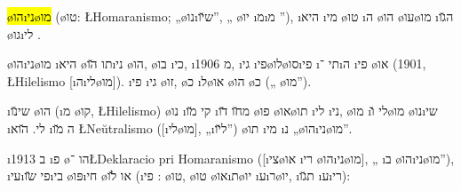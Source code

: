
\hl{\o{הו}\i{ני}\o{מו}} (\o{טו}: \L{Homaranismo}; „\o{נו}\i{ש}\u{יו}”, „  \o{יו}  \i{מ}\i{מ} ”), \i{היא} \i{מי} \o{טו}  \i{ה} \o{הו}     \o{עו}\o{מו}  \i{ה}\u{גו}  \o{גו}\i{לי}   .

\o{הו}\i{ני}\o{מו} \i{היא} \o{תו} \u{הו}\i{ני}  \o{הו},   \o{בו} \i{כי},  \i{מ} 1906,  \i{גי} \i{פי}\o{לו}\o{סו}\i{פי} \i{תי}  ־\i{ה} \i{פי}  \o{או} (1901, \L{Hilelismo} [\i{ה}\i{לי}\o{מו}]).  \i{פי} \i{גי} \o{זו},  \o{כ}  \i{ל}\o{או} \o{הו}  \o{כ}    („  \o{מו}”).

\i{שי}\u{נו}    \o{הו} (\i{מ}  \o{קו}, \L{Hilelismo}) \o{נו} \i{קי}  \u{מו} \i{מ}\u{חו} \u{דו} \o{פו} \o{או}\o{תו} \i{לי}   \i{ני},  \o{מו}  \i{לי}  \u{ו}\o{מו}   \o{נו}\i{שי} \i{לי}. \u{הוא}  \i{ה} \u{מו} \L{Neŭtralismo} ([\i{לי}\o{מו}], „\i{ל}\u{יו}”) \o{תו} \i{מי} \i{נ} „\o{הו}\i{ני}\o{מו}”.

\i{ב} 1913 \i{פ} \o{הו}  ־\L{Deklaracio pri Homaranismo} ([\i{צי}\o{או} \i{רי} \o{הו}\i{ני}\o{מו}], „ \i{ב} \o{הו}\i{ני}\o{מו}”),   \i{עי}\i{פי} \u{שו}\i{בי} \o{פּו}\i{חי} \o{או}  \u{לו} (\i{פי} : \o{טו}, \o{טו} \o{או}\i{ת}\o{יו} \i{ע}\i{ר}\o{יו}, \i{ת}\u{גו} \i{ע}\i{רי}):

